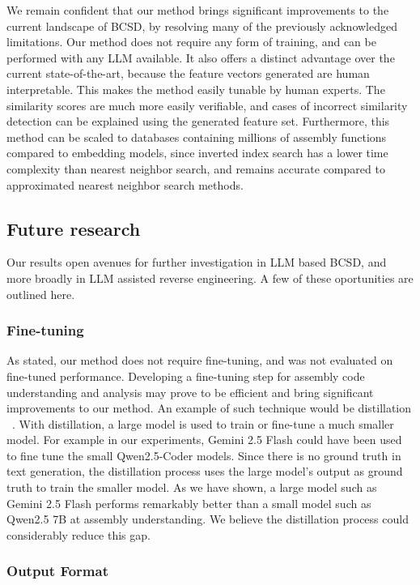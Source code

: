 We remain confident that our method brings significant improvements to the current landscape of BCSD, by resolving
many of the previously acknowledged limitations. Our method does not require any form of training, and can be performed with any LLM
available. It also offers a distinct advantage over the current state-of-the-art, because the feature vectors generated are human
interpretable. This makes the method easily tunable by human experts. The similarity scores are much more easily verifiable, and
cases of incorrect similarity detection can be explained using the generated feature set. Furthermore, this method can be scaled to
databases containing millions of assembly functions compared to embedding models, since inverted index search has a lower time
complexity than nearest neighbor search, and remains accurate compared to approximated nearest neighbor search methods.

\subsection{Future research}

Our results open avenues for further investigation in LLM based BCSD, and more broadly in LLM assisted reverse engineering.
A few of these oportunities are outlined here.

\subsubsection{Fine-tuning}

As stated, our method does not require fine-tuning, and was not evaluated on fine-tuned performance. Developing a fine-tuning step
for assembly code understanding and analysis may prove to be efficient and bring significant improvements to our method.
An example of such technique would be distillation ~\cite{distillation}. With distillation, a large model is used to train or fine-tune a
much smaller model. For example in our experiments, Gemini 2.5 Flash could have been used to fine tune the small Qwen2.5-Coder models.
Since there is no ground truth in text generation, the distillation process uses the large model's output as ground truth
to train the smaller model. As we have shown, a large model such as Gemini 2.5 Flash performs remarkably better than a
small model such as Qwen2.5 7B at assembly understanding. We believe the distillation process could considerably reduce this gap.

\subsubsection{Output Format}

